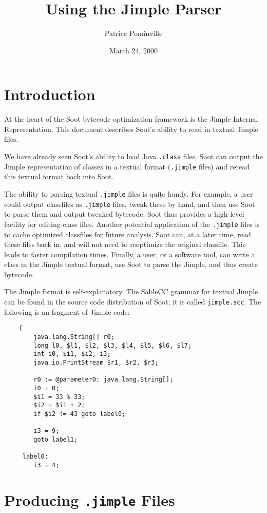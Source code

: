 \documentclass[11pt]{article}
\title{Using the Jimple Parser}
\author{Patrice Pominville\\ \htmladdnormallink{patrice@sable.mcgill.ca}{mailto:patrice@sable.mcgill.ca}}
\date{March 24, 2000}
\begin{document}
\maketitle

\section{Introduction}
At the heart of the Soot bytecode optimization framework is the Jimple
Internal Representation.  This document describes Soot's ability to
read in textual Jimple files.

We have already seen Soot's ability to load Java {\tt .class} files.
Soot can output the Jimple representation of classes in a textual
format ({\tt .jimple} files) and reread this textual format back into
Soot.  

The ability to parsing textual {\tt .jimple} files is quite handy. For
example, a user could output classfiles as {\tt .jimple} files, tweak
these by hand, and then use Soot to parse them and output tweaked
bytecode.  Soot thus provides a high-level facility for editing class
files.  Another potential application of the {\tt .jimple} files is to
cache optimized classfiles for future analysis. Soot can, at a
later time, read these files back in, and will not need to reoptimize
the original classfile.  This leads to faster compilation times.
Finally, a user, or a software tool, can write a class in the Jimple
textual format, use Soot to parse the Jimple, and thus create bytecode. 

The Jimple format is self-explanatory. The SableCC grammar for textual
Jimple can be found in the source code distribution of Soot; it is called
{\tt jimple.scc}. The following is an fragment of Jimple code:

\begin{verbatim}
    {
        java.lang.String[] r0;
        long l0, $l1, $l2, $l3, $l4, $l5, $l6, $l7;
        int i0, $i1, $i2, i3;
        java.io.PrintStream $r1, $r2, $r3;

        r0 := @parameter0: java.lang.String[];
        i0 = 0;
        $i1 = 33 % 33;
        $i2 = $i1 + 2;
        if $i2 != 43 goto label0;

        i3 = 9;
        goto label1;

     label0:
        i3 = 4;
\end{verbatim}

\section{Producing {\tt .jimple} Files}
\end{document}
